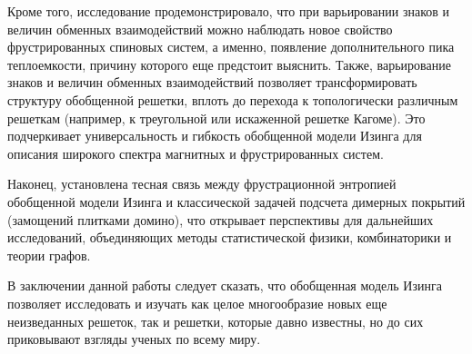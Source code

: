\documentclass[utf8,12pt]{jetp}
\begin{document}
Кроме того, исследование продемонстрировало, что при варьировании знаков и величин обменных взаимодействий можно наблюдать новое свойство фрустрированных спиновых систем, а именно, появление дополнительного пика теплоемкости, причину которого еще предстоит выяснить. Также, варьирование знаков и величин обменных взаимодействий позволяет трансформировать структуру обобщенной решетки, вплоть до перехода к топологически различным решеткам (например, к треугольной или искаженной решетке Кагоме). Это подчеркивает универсальность и гибкость обобщенной модели Изинга для описания широкого спектра магнитных и фрустрированных систем.

Наконец, установлена тесная связь между фрустрационной энтропией обобщенной модели Изинга и классической задачей подсчета димерных покрытий (замощений плитками домино), что открывает перспективы для дальнейших исследований, объединяющих методы статистической физики, комбинаторики и теории графов. 

В заключении данной работы следует сказать, что обобщенная модель Изинга позволяет исследовать и изучать как целое многообразие новых еще неизведанных решеток, так и решетки, которые давно известны, но до сих приковывают взгляды ученых по всему миру.
		
	
	
\end{document}
